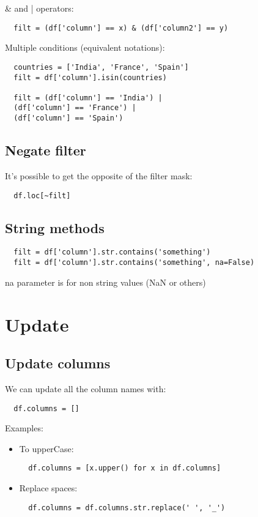 \documentclass[french]{article}
\begin{document}
\& and | operators:
\begin{lstlisting}
  filt = (df['column'] == x) & (df['column2'] == y)
\end{lstlisting}

Multiple conditions (equivalent notations):
\begin{lstlisting}
  countries = ['India', 'France', 'Spain']
  filt = df['column'].isin(countries)

  filt = (df['column'] == 'India') |
  (df['column'] == 'France') |
  (df['column'] == 'Spain')
\end{lstlisting}

\subsection{Negate filter}
It's possible to get the opposite of the filter mask:
\begin{lstlisting}
  df.loc[~filt]
\end{lstlisting}

\subsection{String methods}

\begin{lstlisting}
  filt = df['column'].str.contains('something')
  filt = df['column'].str.contains('something', na=False)
\end{lstlisting}
na parameter is for non string values (NaN or others)

\section{Update}

\subsection{Update columns}
We can update all the column names with:
\begin{lstlisting}
  df.columns = []
\end{lstlisting}

Examples:
\begin{itemize}
\item To upperCase:
\begin{lstlisting}
  df.columns = [x.upper() for x in df.columns]
\end{lstlisting}

\item Replace spaces:
\begin{lstlisting}
  df.columns = df.columns.str.replace(' ', '_')
\end{lstlisting}
\end{itemize}
\end{document}
